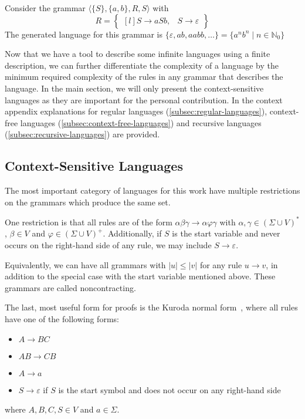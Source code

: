 \begin{exmp}
    Consider the grammar $\langle \{S\}, \{a, b\}, R, S \rangle$ with
    \[
        R = \begin{Bmatrix*}[l]
                S \to aSb,
                &S \to \varepsilon
        \end{Bmatrix*}
    \]
    The generated language for this grammar is $\{\varepsilon, ab, aabb, \dots\} = \{a^{n}b^{n} \mid n \in \mathbb{N}_0\}$
\end{exmp}

Now that we have a tool to describe some infinite languages using a finite description, we can further differentiate the complexity of a language by the minimum required complexity of the rules in any grammar that describes the language.
In the main section, we will only present the context-sensitive languages as they are important for the personal contribution.
In the context appendix explanations for regular languages (\cref{subsec:regular-languages}), context-free languages (\cref{subsec:context-free-languages}) and recursive languages (\cref{subsec:recursive-languages}) are provided.

\subsection{Context-Sensitive Languages}\label{subsec:context-sensitive-languages}

The most important category of languages for this work have multiple restrictions on the grammars which produce the same set.

One restriction is that all rules are of the form $\alpha\beta\gamma \to \alpha\varphi\gamma$ with $\alpha, \gamma \in (\Sigma \cup V)^{*}$, $\beta \in V$ and $\varphi \in (\Sigma \cup V)^{+}$.
Additionally, if $S$ is the start variable and never occurs on the right-hand side of any rule, we may include $S \to \varepsilon$.

Equivalently, we can have all grammars with $|u| \leq |v|$ for any rule $u \to v$, in addition to the special case with the start variable mentioned above.
These grammars are called noncontracting.

The last, most useful form for proofs is the Kuroda normal form~\cite{Pettorossi2022}, where all rules have one of the following forms:
\begin{itemize}
    \setlength\itemsep{0.2em}
    \item $A \to BC$
    \item $AB \to CB$
    \item $A \to a$
    \item $S \to \varepsilon$ if $S$ is the start symbol and does not occur on any right-hand side
\end{itemize}
where $A, B, C, S \in V$ and $a \in \Sigma$.

